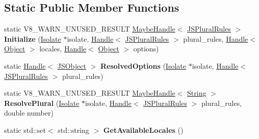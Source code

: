 \subsection*{Static Public Member Functions}
\begin{DoxyCompactItemize}
\item 
\mbox{\label{classv8_1_1internal_1_1JSPluralRules_a28dd2319beac6f707dfc7ba5405ff008}} 
static V8\+\_\+\+W\+A\+R\+N\+\_\+\+U\+N\+U\+S\+E\+D\+\_\+\+R\+E\+S\+U\+LT \mbox{\hyperlink{classv8_1_1internal_1_1MaybeHandle}{Maybe\+Handle}}$<$ \mbox{\hyperlink{classv8_1_1internal_1_1JSPluralRules}{J\+S\+Plural\+Rules}} $>$ {\bfseries Initialize} (\mbox{\hyperlink{classv8_1_1internal_1_1Isolate}{Isolate}} $\ast$isolate, \mbox{\hyperlink{classv8_1_1internal_1_1Handle}{Handle}}$<$ \mbox{\hyperlink{classv8_1_1internal_1_1JSPluralRules}{J\+S\+Plural\+Rules}} $>$ plural\+\_\+rules, \mbox{\hyperlink{classv8_1_1internal_1_1Handle}{Handle}}$<$ \mbox{\hyperlink{classv8_1_1internal_1_1Object}{Object}} $>$ locales, \mbox{\hyperlink{classv8_1_1internal_1_1Handle}{Handle}}$<$ \mbox{\hyperlink{classv8_1_1internal_1_1Object}{Object}} $>$ options)
\item 
\mbox{\label{classv8_1_1internal_1_1JSPluralRules_a98c1dd36eab82d2fbd231f0706df3878}} 
static \mbox{\hyperlink{classv8_1_1internal_1_1Handle}{Handle}}$<$ \mbox{\hyperlink{classv8_1_1internal_1_1JSObject}{J\+S\+Object}} $>$ {\bfseries Resolved\+Options} (\mbox{\hyperlink{classv8_1_1internal_1_1Isolate}{Isolate}} $\ast$isolate, \mbox{\hyperlink{classv8_1_1internal_1_1Handle}{Handle}}$<$ \mbox{\hyperlink{classv8_1_1internal_1_1JSPluralRules}{J\+S\+Plural\+Rules}} $>$ plural\+\_\+rules)
\item 
\mbox{\label{classv8_1_1internal_1_1JSPluralRules_aefd39f4a782e31d35f07f4466d92710b}} 
static V8\+\_\+\+W\+A\+R\+N\+\_\+\+U\+N\+U\+S\+E\+D\+\_\+\+R\+E\+S\+U\+LT \mbox{\hyperlink{classv8_1_1internal_1_1MaybeHandle}{Maybe\+Handle}}$<$ \mbox{\hyperlink{classv8_1_1internal_1_1String}{String}} $>$ {\bfseries Resolve\+Plural} (\mbox{\hyperlink{classv8_1_1internal_1_1Isolate}{Isolate}} $\ast$isolate, \mbox{\hyperlink{classv8_1_1internal_1_1Handle}{Handle}}$<$ \mbox{\hyperlink{classv8_1_1internal_1_1JSPluralRules}{J\+S\+Plural\+Rules}} $>$ plural\+\_\+rules, double number)
\item 
\mbox{\label{classv8_1_1internal_1_1JSPluralRules_a671924853cfef59f00472ece845be4ea}} 
static std\+::set$<$ std\+::string $>$ {\bfseries Get\+Available\+Locales} ()
\end{DoxyCompactItemize}
